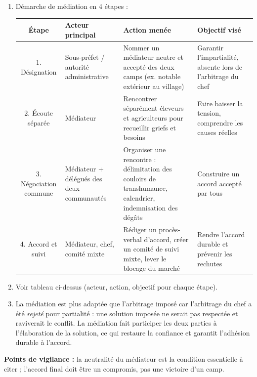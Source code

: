 \documentclass[11pt]{article}
\begin{document}
\begin{corrige}
\begin{enumerate}
\item Démarche de médiation en 4 étapes :
\begin{center}
\begin{tabularx}{\linewidth}{|c|X|X|X|}
\hline
\rowcolor{popblueL} \textbf{Étape} & \textbf{Acteur principal} & \textbf{Action menée} & \textbf{Objectif visé} \\
\hline
1. Désignation & Sous-préfet / autorité administrative & Nommer un médiateur neutre et accepté des deux camps (ex. notable extérieur au village) & Garantir l'impartialité, absente lors de l'arbitrage du chef \\
\hline
2. Écoute séparée & Médiateur & Rencontrer séparément éleveurs et agriculteurs pour recueillir griefs et besoins & Faire baisser la tension, comprendre les causes réelles \\
\hline
3. Négociation commune & Médiateur + délégués des deux communautés & Organiser une rencontre : délimitation des couloirs de transhumance, calendrier, indemnisation des dégâts & Construire un accord accepté par tous \\
\hline
4. Accord et suivi & Médiateur, chef, comité mixte & Rédiger un procès-verbal d'accord, créer un comité de suivi mixte, lever le blocage du marché & Rendre l'accord durable et prévenir les rechutes \\
\hline
\end{tabularx}
\end{center}
\item Voir tableau ci-dessus (acteur, action, objectif pour chaque étape).
\item La médiation est plus adaptée que l'arbitrage imposé car l'arbitrage du chef a été \emph{rejeté} pour partialité : une solution imposée ne serait pas respectée et raviverait le conflit. La médiation fait participer les deux parties à l'élaboration de la solution, ce qui restaure la confiance et garantit l'adhésion durable à l'accord.
\end{enumerate}
\textbf{Points de vigilance :} la neutralité du médiateur est la condition essentielle à citer ; l'accord final doit être un compromis, pas une victoire d'un camp.
\end{corrige}
\end{document}
